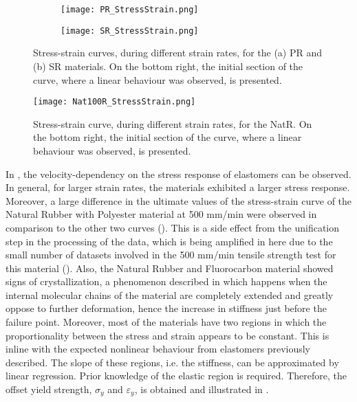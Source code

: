 \newpage
\begin{figure}[H]
    \vspace{-2em}
    \centering
    \begin{subfigure}[b]{0.93\textwidth}
    \centering
    \texttt{[image: PR\_StressStrain.png]}
    \caption{}
    \label{fig:PRSS}
    \end{subfigure}

    \begin{subfigure}[b]{0.93\textwidth}
    \centering
    \texttt{[image: SR\_StressStrain.png]}
    \caption{}
    \label{fig:SRSS}
    \end{subfigure}
    \caption{Stress-strain curves, during different strain rates, for the (a) PR and (b) SR materials. On the bottom right, the initial section of the curve, where a linear behaviour was observed, is presented.}
    \label{fig:PR-SRSS}
\end{figure}
\newpage
\begin{figure}[H]
    \vspace*{-2em}
    \centering
    \texttt{[image: Nat100R\_StressStrain.png]}
    \caption{Stress-strain curve, during different strain rates, for the NatR. On the bottom right, the initial section of the curve, where a linear behaviour was observed, is presented.}
    \label{fig:Nat100RSS}
\end{figure}
\vspace*{-1em}
In , the velocity-dependency on the stress response of elastomers can be observed. In general, for larger strain rates, the materials exhibited a larger stress response. Moreover, a large difference in the ultimate values of the stress-strain curve of the Natural Rubber with Polyester material at 500 mm/min were observed in comparison to the other two curves (). This is a side effect from the unification step in the processing of the data, which is being amplified in here due to the small number of datasets involved in the 500 mm/min tensile strength test for this material (). Also, the Natural Rubber and Fluorocarbon material showed signs of crystallization, a phenomenon described in \cite{Bauman2008} which happens when the internal molecular chains of the material are completely extended and greatly oppose to further deformation, hence the increase in stiffness just before the failure point. Moreover, most of the materials have two regions in which the proportionality between the stress and strain appears to be constant. This is inline with the expected nonlinear behaviour from elastomers previously described. The slope of these regions, i.e. the stiffness, can be approximated by linear regression. Prior knowledge of the elastic region is required. Therefore, the offset yield strength, $\sigma_y$ and $\varepsilon_y$, is obtained and illustrated in .


